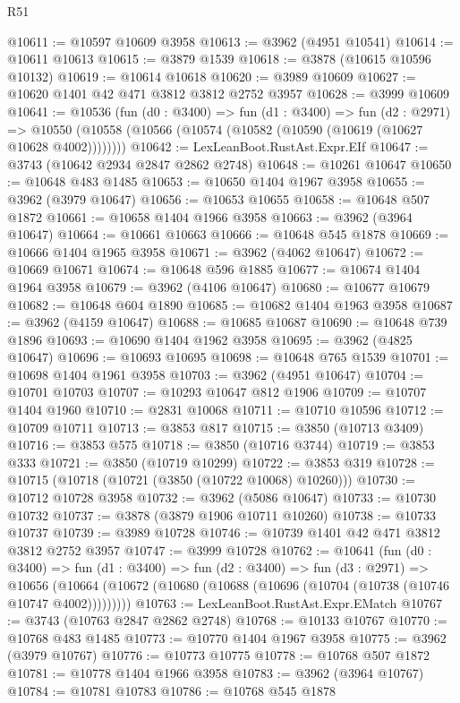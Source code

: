 \begin{lexlean}{R51}
\begin{coremodule}
@10611 := @10597 @10609 @3958
@10613 := @3962 (@4951 @10541)
@10614 := @10611 @10613
@10615 := @3879 @1539
@10618 := @3878 (@10615 @10596 @10132)
@10619 := @10614 @10618
@10620 := @3989 @10609
@10627 := @10620 @1401 @42 @471 @3812 @3812 @2752 @3957
@10628 := @3999 @10609
@10641 := @10536
    (fun (d0 : @3400) =>
    fun (d1 : @3400) =>
    fun (d2 : @2971) =>
    @10550 (@10558 (@10566 (@10574 (@10582 (@10590 (@10619 (@10627 @10628 @4002))))))))
@10642 := LexLeanBoot.RustAst.Expr.EIf
@10647 := @3743 (@10642 @2934 @2847 @2862 @2748)
@10648 := @10261 @10647
@10650 := @10648 @483 @1485
@10653 := @10650 @1404 @1967 @3958
@10655 := @3962 (@3979 @10647)
@10656 := @10653 @10655
@10658 := @10648 @507 @1872
@10661 := @10658 @1404 @1966 @3958
@10663 := @3962 (@3964 @10647)
@10664 := @10661 @10663
@10666 := @10648 @545 @1878
@10669 := @10666 @1404 @1965 @3958
@10671 := @3962 (@4062 @10647)
@10672 := @10669 @10671
@10674 := @10648 @596 @1885
@10677 := @10674 @1404 @1964 @3958
@10679 := @3962 (@4106 @10647)
@10680 := @10677 @10679
@10682 := @10648 @604 @1890
@10685 := @10682 @1404 @1963 @3958
@10687 := @3962 (@4159 @10647)
@10688 := @10685 @10687
@10690 := @10648 @739 @1896
@10693 := @10690 @1404 @1962 @3958
@10695 := @3962 (@4825 @10647)
@10696 := @10693 @10695
@10698 := @10648 @765 @1539
@10701 := @10698 @1404 @1961 @3958
@10703 := @3962 (@4951 @10647)
@10704 := @10701 @10703
@10707 := @10293 @10647 @812 @1906
@10709 := @10707 @1404 @1960
@10710 := @2831 @10068
@10711 := @10710 @10596
@10712 := @10709 @10711
@10713 := @3853 @817
@10715 := @3850 (@10713 @3409)
@10716 := @3853 @575
@10718 := @3850 (@10716 @3744)
@10719 := @3853 @333
@10721 := @3850 (@10719 @10299)
@10722 := @3853 @319
@10728 := @10715 (@10718 (@10721 (@3850 (@10722 @10068) @10260)))
@10730 := @10712 @10728 @3958
@10732 := @3962 (@5086 @10647)
@10733 := @10730 @10732
@10737 := @3878 (@3879 @1906 @10711 @10260)
@10738 := @10733 @10737
@10739 := @3989 @10728
@10746 := @10739 @1401 @42 @471 @3812 @3812 @2752 @3957
@10747 := @3999 @10728
@10762 := @10641
    (fun (d0 : @3400) =>
    fun (d1 : @3400) =>
    fun (d2 : @3400) =>
    fun (d3 : @2971) =>
    @10656 (@10664 (@10672 (@10680 (@10688 (@10696 (@10704 (@10738 (@10746 @10747 @4002)))))))))
@10763 := LexLeanBoot.RustAst.Expr.EMatch
@10767 := @3743 (@10763 @2847 @2862 @2748)
@10768 := @10133 @10767
@10770 := @10768 @483 @1485
@10773 := @10770 @1404 @1967 @3958
@10775 := @3962 (@3979 @10767)
@10776 := @10773 @10775
@10778 := @10768 @507 @1872
@10781 := @10778 @1404 @1966 @3958
@10783 := @3962 (@3964 @10767)
@10784 := @10781 @10783
@10786 := @10768 @545 @1878

\end{coremodule}
\end{lexlean}
